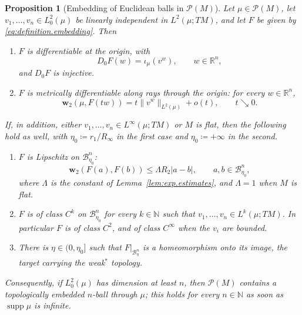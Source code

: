 \documentclass[11pt,reqno]{amsart}
\theoremstyle{plain}
\newtheorem{prp}[thm]{Proposition}
\theoremstyle{definition}
\newcommand{\dw}{\mathbf{w}_2}
\newcommand{\R}{\mathbb{R}}
\newcommand{\N}{\mathbb{N}}
\newcommand{\Prob}{\mathcal{P}}
\begin{document}
\begin{prp}[Embedding of Euclidean balls in \( \Prob(M) \)]
\label{prp:ball.embedding}
    Let \( \mu\in\Prob(M) \), let \( v_1,\dots,v_n\in L^2_0(\mu) \) be linearly independent in \( L^2(\mu;TM) \), and let \( F \) be given by \eqref{eq:definition.embedding}.
    Then
    \begin{enumerate}
        \item\label{item:emb.diff}
            \( F \) is differentiable at the origin, with
            \[
                D_0F(w)=\iota_\mu\left(v^w\right),\qquad w\in\R^n,
            \]
            and \( D_0F \) is injective.
        \item\label{item:emb.rays}
            \( F \) is metrically differentiable along rays through the origin: for every \( w\in\R^n \),
            \[
                \dw\left(\mu,F(tw)\right)=t\lVert v^w\rVert_{L^2(\mu)}+o(t),\qquad t\searrow0 .
            \]
    \end{enumerate}
        If, in addition, either \( v_1,\dots,v_n\in L^\infty(\mu;TM) \) or \( M \) is flat, then the following hold as well, with \( \eta_0\coloneqq r_1/R_\infty \) in the first case and \( \eta_0\coloneqq+\infty \) in the second.
    \begin{enumerate}[start=3]
        \item\label{item:emb.lip}
            \( F \) is Lipschitz on \( \mathcal B^n_{\eta_0} \):
            \[
                \dw\left(F(a),F(b)\right)\le\Lambda R_2\lvert a-b\rvert,
                \qquad a,b\in\mathcal B^n_{\eta_0},
            \]
            where \( \Lambda \) is the constant of Lemma~\ref{lem:exp.estimates}, and \( \Lambda=1 \) when \( M \) is flat.
        \item\label{item:emb.reg}
            \( F \) is of class \( C^k \) on \( \mathcal B^n_{\eta_0} \) for every \( k\in\N \) such that \( v_1,\dots,v_n\in L^k(\mu;TM) \).
            In particular \( F \) is of class \( C^2 \), and of class \( C^\infty \) when the \( v_i \) are bounded.
        \item\label{item:emb.embedding}
            There is \( \eta\in(0,\eta_0] \) such that \( F|_{\mathcal B^n_\eta} \) is a homeomorphism onto its image, the target carrying the weak\( ^\ast \) topology.
    \end{enumerate}
    Consequently, if \( L^2_0(\mu) \) has dimension at least \( n \), then \( \Prob(M) \) contains a topologically embedded \( n \)-ball through \( \mu \); this holds for every \( n\in\N \) as soon as \( \operatorname{supp}\mu \) is infinite.
\end{prp}
\end{document}
